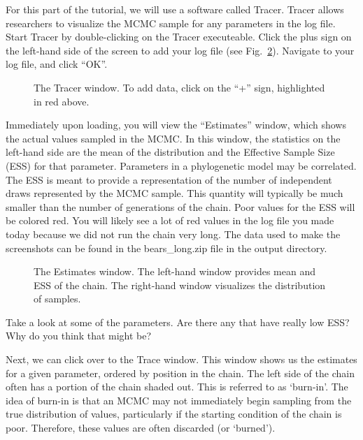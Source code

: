 For this part of the tutorial, we will use a software called Tracer. Tracer allows researchers to visualize the MCMC sample for any parameters in the log file. Start Tracer by double-clicking on the Tracer executeable. Click the plus sign on the left-hand side of the screen to add your log file (see Fig.\ \ref{fig:tracer}). Navigate to your log file, and click ``OK''. \par
\begin{figure}[h!]
\centering
{}
\caption{\small The Tracer window. To add data, click on the ``+'' sign, highlighted in red above.}
\label{fig:tracer}
\end{figure}
Immediately upon loading, you will view the ``Estimates'' window, which shows the actual values sampled in the MCMC. In this window, the statistics on the left-hand side are the mean of the distribution and the Effective Sample Size (ESS) for that parameter. Parameters in a phylogenetic model may be correlated. The ESS is meant to provide a representation of the number of independent draws represented by the MCMC sample. This quantity will typically be much smaller than the number of generations of the chain. Poor values for the ESS will be colored red. You will likely see a lot of red values in the log file you made today because we did not run the chain very long. The data used to make the screenshots can be found in the bears\_long.zip file in the output directory. \par
\begin{figure}[h!]
\centering
{}
\caption{\small The Estimates window. The left-hand window provides mean and ESS of the chain. The right-hand window visualizes the distribution of samples.}
\label{fig:tracer}
\end{figure}
Take a look at some of the parameters. Are there any that have really low ESS? Why do you think that might be? \par
Next, we can click over to the Trace window. This window shows us the estimates for a given parameter, ordered by position in the chain. The left side of the chain often has a portion of the chain shaded out. This is referred to as `burn-in'. The idea of burn-in is that an MCMC may not immediately begin sampling from the true distribution of values, particularly if the starting condition of the chain is poor. Therefore, these values are often discarded (or `burned'). \par
